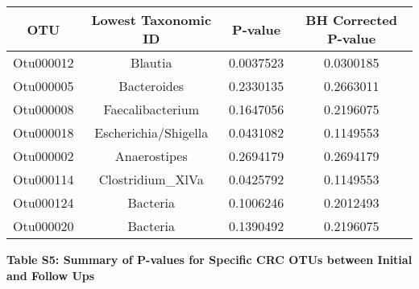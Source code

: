 \documentclass[12pt,]{article}
\begin{document}
\begin{longtable}[]{@{}cccc@{}}
\toprule
OTU & Lowest Taxonomic ID & P-value & BH Corrected
P-value\tabularnewline
\midrule
\endhead
Otu000012 & Blautia & 0.0037523 & 0.0300185\tabularnewline
Otu000005 & Bacteroides & 0.2330135 & 0.2663011\tabularnewline
Otu000008 & Faecalibacterium & 0.1647056 & 0.2196075\tabularnewline
Otu000018 & Escherichia/Shigella & 0.0431082 & 0.1149553\tabularnewline
Otu000002 & Anaerostipes & 0.2694179 & 0.2694179\tabularnewline
Otu000114 & Clostridium\_XlVa & 0.0425792 & 0.1149553\tabularnewline
Otu000124 & Bacteria & 0.1006246 & 0.2012493\tabularnewline
Otu000020 & Bacteria & 0.1390492 & 0.2196075\tabularnewline
\bottomrule
\end{longtable}

\newpage

\textbf{Table S5: Summary of P-values for Specific CRC OTUs between
Initial and Follow Ups}
\end{document}
